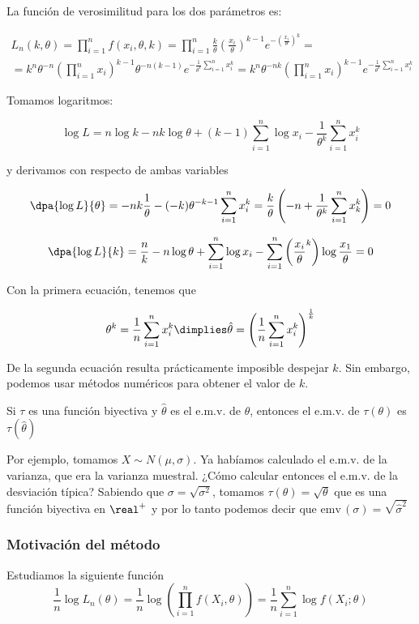 \documentclass{apuntes}
\begin{document}
La función de verosimilitud para los dos parámetros es:

\begin{gather*}
L_n(k,\theta) =
\prod_{i=1}^n f(x_i, \theta, k) =
\prod_{i=1}^n \frac{k}{\theta}\left(\frac{x_i}{\theta}\right)^{k-1}e^{-\left(\frac{x_i}{\theta}\right)^k} = \\
= k^n \theta^{-n}\left(\prod_{i=1}^n x_i\right)^{k-1} \theta^{-n(k-1)} e^{-\frac{1}{\theta^k}\sum\limits_{i=1}^nx_i^k} =
k^n\theta^{-nk} \left(\prod_{i=1}^n x_i\right)^{k-1} e^{-\frac{1}{\theta^k}\sum\limits_{i=1}^nx_i^k}
\end{gather*}

Tomamos logaritmos:

\[
\log L =
n\log k - nk\log \theta + (k-1)\sum\limits_{i=1}^n\log x_i - \frac{1}{\theta^k} \sum\limits_{i=1}^n x_i^k
\]

y derivamos con respecto de ambas variables

\[
\dpa{\log L}{\theta} =
-nk \frac{1}{\theta} - (-k) \theta^{-k-1} \sum_{i=1}^nx_i^k =
\frac{k}{\theta}\left(-n + \frac{1}{\theta^k}\sum_{i=1}^nx_k^k\right) = 0
\]

\[
\dpa{\log L}{k} =
\frac{n}{k} -n\log\theta + \sum_{i=1}^n \log x_i - \sum_{i=1}^n\left(\frac{x_i}{\theta}^k\right) \log\frac{x_1}{\theta} = 0
\]

Con la primera ecuación, tenemos que

\[
\theta^k =
\frac{1}{n}\sum\limits_{i=1}^n x_i^k \dimplies
\hat{\theta} =
\left(\frac{1}{n}\sum\limits_{i=1}^n x_i^k \right)^\frac{1}{k}
\]

De la segunda ecuación resulta prácticamente imposible despejar $k$. Sin embargo, podemos usar métodos numéricos para obtener el valor de $k$.

\begin{theorem} Si $\tau$ es una función biyectiva y $\hat{\theta}$ es el e.m.v. de $\theta$, entonces el e.m.v. de $\tau(\theta)$ es $\tau(\hat\theta)$
\end{theorem}

Por ejemplo, tomamos $X\sim N(\mu, \sigma)$. Ya habíamos calculado el e.m.v. de la varianza, que era la varianza muestral. ¿Cómo calcular entonces el e.m.v. de la desviación típica? Sabiendo que $\sigma = \sqrt{\sigma^2}$, tomamos $\tau(\theta) = \sqrt{\theta}$ que es una función biyectiva en $\real^+$ y por lo tanto podemos decir que $\text{emv}\,(\sigma) = \sqrt{\hat\sigma^2}$

\subsubsection{Motivación del método}
Estudiamos la siguiente función
\[ \frac{1}{n}\log L_n(\theta) = \frac{1}{n} \log \left(\prod_{i=1}^nf(X_i,\theta)\right) = \frac{1}{n}\sum_{i=1}^n \log f(X_i;\theta) \]
\end{document}
